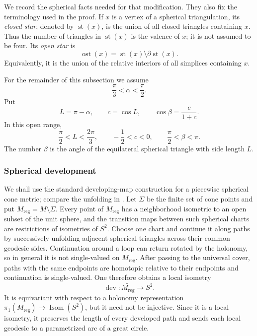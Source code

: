 \documentclass[12pt,a4paper]{article}
\theoremstyle{definition}
\begin{document}
We record the spherical facts needed for that modification.  They also fix the
terminology used in the proof.  If \(x\) is a vertex of a spherical
triangulation, its \emph{closed star}, denoted by \(\operatorname{st}(x)\), is
the union of all closed triangles containing \(x\).  Thus the number of
triangles in \(\operatorname{st}(x)\) is the valence of \(x\); it is not
assumed to be four.  Its \emph{open star} is
\[
        \operatorname{ost}(x)
        =\operatorname{st}(x)\setminus\partial\operatorname{st}(x).
\]
Equivalently, it is the union of the relative interiors of all simplices
containing \(x\).

For the remainder of this subsection we assume
\[
        \frac{\pi}{3}<\alpha<\frac\pi2 .
\]
Put
\begin{equation}\label{eq:polar-L-beta}
        L=\pi-\alpha,
        \qquad c=\cos L,
        \qquad
        \cos\beta=\frac{c}{1+c}.
\end{equation}
In this open range,
\begin{equation}\label{eq:L-beta-ranges}
        \frac\pi2<L<\frac{2\pi}{3},
        \qquad -\frac12<c<0,
        \qquad \frac\pi2<\beta<\pi .
\end{equation}
The number \(\beta\) is the angle of the equilateral spherical triangle with
side length \(L\).

\subsubsection*{Spherical development}

We shall use the standard developing-map construction for a piecewise
spherical cone metric; compare the unfolding in
\cite[proof of Lemma~8.7]{CharneyDavis1993}.  Let \(\Sigma\) be the finite set
of cone points and put \(M_{\mathrm{reg}}=M\setminus\Sigma\).  Every point of
\(M_{\mathrm{reg}}\) has a neighborhood isometric to an open subset of the
unit sphere, and the transition maps between such spherical charts are
restrictions of isometries of \(S^2\).  Choose one chart and continue it along
paths by successively unfolding adjacent spherical triangles across their
common geodesic sides.  Continuation around a loop can return rotated by the
holonomy, so in general it is not single-valued on \(M_{\mathrm{reg}}\).
After passing to the universal cover, paths with the same endpoints are
homotopic relative to their endpoints and continuation is single-valued.  One
therefore obtains a local isometry
\[
        \operatorname{dev}\colon
        \widetilde{M_{\mathrm{reg}}}\longrightarrow S^2 .
\]
It is equivariant with respect to a holonomy representation
\(\pi_1(M_{\mathrm{reg}})\to\operatorname{Isom}(S^2)\), but it need not be
injective.  Since it is a local isometry, it preserves the length of every
developed path and sends each local geodesic to a parametrized arc of a great
circle.
\end{document}
